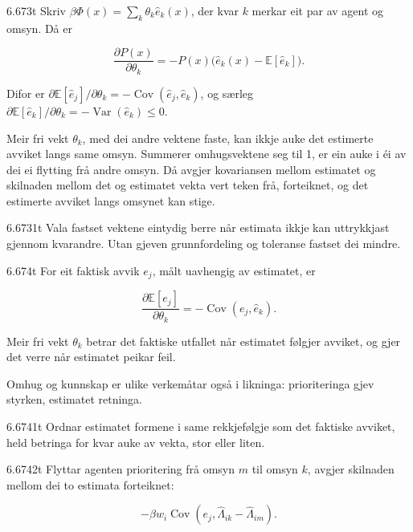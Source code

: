 \begin{formproposition}{6.673}{t}
Skriv \(\beta\Phi(x)=\sum_k\theta_k\hat e_k(x)\), der kvar \(k\) merkar eit par av agent og omsyn. Då er

\[
\frac{\partial P(x)}{\partial\theta_k}=-P(x)\bigl(\hat e_k(x)-\mathbb E[\hat e_k]\bigr).
\]

Difor er \(\partial\mathbb E[\hat e_j]/\partial\theta_k=-\operatorname{Cov}(\hat e_j,\hat e_k)\), og særleg \(\partial\mathbb E[\hat e_k]/\partial\theta_k=-\operatorname{Var}(\hat e_k)\leq0\).

Meir fri vekt \(\theta_k\), med dei andre vektene faste, kan ikkje auke det estimerte avviket langs same omsyn. Summerer omhugsvektene seg til 1, er ein auke i éi av dei ei flytting frå andre omsyn. Då avgjer kovariansen mellom estimatet og skilnaden mellom det og estimatet vekta vert teken frå, forteiknet, og det estimerte avviket langs omsynet kan stige.
\end{formproposition}

\begin{formproposition}{6.6731}{t}
Vala fastset vektene eintydig berre når estimata ikkje kan uttrykkjast gjennom kvarandre. Utan gjeven grunnfordeling og toleranse fastset dei mindre.
\end{formproposition}

\begin{formproposition}{6.674}{t}
For eit faktisk avvik \(e_j\), målt uavhengig av estimatet, er

\[
\frac{\partial\mathbb E[e_j]}{\partial\theta_k}=-\operatorname{Cov}(e_j,\hat e_k).
\]

Meir fri vekt \(\theta_k\) betrar det faktiske utfallet når estimatet følgjer avviket, og gjer det verre når estimatet peikar feil.

Omhug og kunnskap er ulike verkemåtar også i likninga: prioriteringa gjev styrken, estimatet retninga.
\end{formproposition}

\begin{formproposition}{6.6741}{t}
Ordnar estimatet formene i same rekkjefølgje som det faktiske avviket, held betringa for kvar auke av vekta, stor eller liten.
\end{formproposition}

\begin{formproposition}{6.6742}{t}
Flyttar agenten prioritering frå omsyn \(m\) til omsyn \(k\), avgjer skilnaden mellom dei to estimata forteiknet:

\[
-\beta w_i\operatorname{Cov}(e_j,\hat\Lambda_{ik}-\hat\Lambda_{im}).
\]
\end{formproposition}


